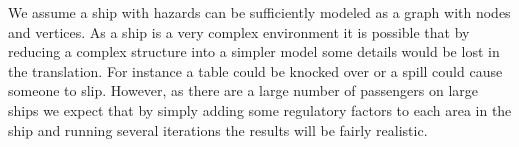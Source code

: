 We assume a ship with hazards can be sufficiently modeled as a graph with nodes and vertices. As a ship is a very complex
environment it is possible that by reducing a complex structure into a simpler model some details would be lost in the
translation. For instance a table could be knocked over or a spill could cause someone to slip. However, as there are a large number of 
passengers on large ships we expect that by simply adding some regulatory factors to each area in the ship and running
several iterations the results will be fairly realistic.
